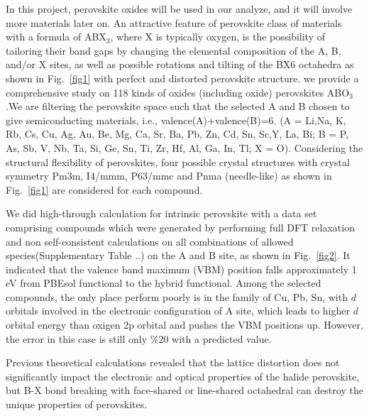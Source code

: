 \documentclass[twocolumn,
superscriptaddress,
 amsmath,amssymb,
 aps, citeautoscript,
prb,
]{revtex4-1}
\begin{document}
In this project, perovskite oxides will be used in our analyze, and it will involve more materials later on. An attractive feature of perovskite class of materials with a formula of ABX$_{3}$, where X is  typically  oxygen, is  the  possibility  of  tailoring  their  band  gaps  by changing the elemental composition of the A, B, and/or X sites, as well as possible rotations and tilting of the BX6 octahedra as shown in Fig.~\ref{fig1} with perfect and distorted perovskite structure.  we provide a comprehensive study on 118 kinds of oxides (including oxide) perovskites ABO$_{3}$.We are filtering the perovskite space such that the selected A and B chosen to give semiconducting materials, i.e., valence(A)+valence(B)=6. (A = Li,Na, K, Rb, Cs, Cu, Ag, Au, Be, Mg, Ca, Sr, Ba, Pb, Zn, Cd, Sn, Sc,Y, La, Bi; B = P, As, Sb, V,  Nb, Ta, Si, Ge, Sn, Ti, Zr, Hf, Al, Ga, In, Tl; X = O). Considering the structural flexibility of perovskites, four possible crystal structures with crystal symmetry Pm3m, I4/mmm, P63/mmc and Pnma (needle-like) as shown in Fig.~\ref{fig1} are considered for each compound.

We did high-through calculation for intrinsic perovskite with a data set comprising compounds which were generated by performing full DFT relaxation and non self-consistent calculations on all combinations of allowed species(Supplementary Table ..) on the A and B site, as shown in Fig.~\ref{fig2}.  It indicated that the valence band maximum (VBM) position falls approximately 1 eV from PBEsol functional to the hybrid functional. Among the selected compounds, the only place perform poorly is in the family of Cu, Pb, Sn, with $d$ orbitals involved in the electronic configuration of A site, which leads to higher $d$ orbital energy than oxigen 2p orbital and pushes the VBM positions up. However, the error in this case is still only \%20 with a predicted value.  




Previous theoretical calculations revealed that the lattice distortion does not significantly impact the electronic and optical properties of the halide perovskite, but B-X bond breaking with face-shared or line-shared octahedral can destroy the unique properties of perovskites.
\end{document}

